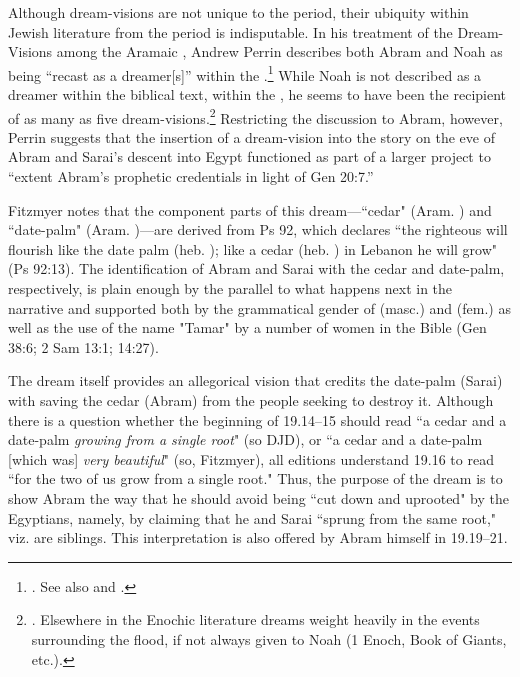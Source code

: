 Although dream-visions are not unique to the \secondtemple period, their ubiquity within Jewish literature from the \secondtemple period is indisputable. In his treatment of the Dream-Visions among the Aramaic \dss, Andrew Perrin describes both Abram and Noah as being ``recast as a dreamer[s]'' within the \ga.\footnote{\cite[52--57]{perrin2015}. See also \cite{eshel_klostergaard-etal2009} and \cite{machiela_falk-etal2010}.} While Noah is not described as a dreamer within the biblical text, within the \ga, he seems to have been the recipient of as many as five dream-visions.\footnote{\cite[53]{perrin2015}. Elsewhere in the Enochic literature dreams weight heavily in the events surrounding the flood, if not always given to Noah (1 Enoch, Book of Giants, etc.).} Restricting the discussion to Abram, however, Perrin suggests that the insertion of a dream-vision into the story on the eve of Abram and Sarai's descent into Egypt functioned as part of a larger project to ``extent Abram's prophetic credentials in light of Gen 20:7.''\autocite[55]{perrin2015} 

Fitzmyer notes that the component parts of this dream---``cedar" (Aram. ) and ``date-palm" (Aram. )---are derived from Ps 92, which declares ``the righteous will flourish like the date palm (heb. ); like a cedar (heb. ) in Lebanon he will grow" (Ps 92:13). The identification of Abram and Sarai with the cedar and date-palm, respectively, is plain enough by the parallel to what happens next in the narrative and supported both by the grammatical gender of  (masc.) and  (fem.) as well as the use of the name "Tamar" by a number of women in the Bible (Gen 38:6; 2 Sam 13:1; 14:27).

The dream itself provides an allegorical vision that credits the date-palm (Sarai) with saving the cedar (Abram) from the people seeking to destroy it. Although there is a question whether the beginning of 19.14--15 should read  ``a cedar and a date-palm \emph{growing from a single root}" (so DJD), or  ``a cedar and a date-palm [which was] \emph{very beautiful}" (so, Fitzmyer), all editions understand 19.16 to read  ``for the two of us grow from a single root." Thus, the purpose of the dream  is to show Abram the way that he should avoid being ``cut down and uprooted" by the Egyptians, namely, by claiming that he and Sarai ``sprung from the same root," viz. are siblings. This interpretation is also offered by Abram himself in 19.19--21.

